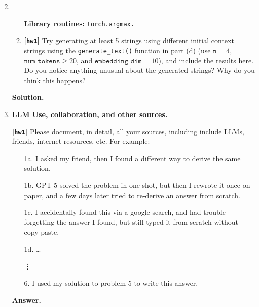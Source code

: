 \documentclass{article}
\def\hw{\textbf{[\texttt{hw1}]}\xspace}
\theoremstyle{definition}
\theoremstyle{remark}
\newenvironment{Q}
{%
  \clearpage
  \item
  }
  {%
    \phantom{s} %
    \bigskip
    \textbf{Solution.}
  }
\begin{document}
\begin{enumerate}[font={\Large\bfseries},left=0pt]
\begin{Q}
\begin{enumerate}
    \textbf{Library routines:} \texttt{torch.argmax.}
    
    \item \hw Try generating at least 5 strings using different initial context strings
    using the \texttt{generate\_text()} function in part (d) (use $\texttt{n}=4$, $\texttt{num\_tokens} \geq 20$, and $\texttt{embedding\_dim}=10$),
    and include the results here. Do you notice anything unusual about the generated strings? Why do you think this happens?
    \end{enumerate}
    \end{Q}
    \clearpage
    \item \textbf{\Large LLM Use, collaboration, and other sources.}
    
    \hw Please document, in detail, all your sources, including include LLMs, friends,
    internet resources, etc.  For example:
    \begin{enumerate}
      \item[1a.] I asked my friend, then I found a different way to derive the same solution.
      \item[1b.] GPT-5 solved the problem in one shot, but then I rewrote it once on
        paper, and a few days later tried to re-derive an answer from scratch.
      \item[1c.] I accidentally found this via a google search,
        and had trouble forgetting the answer I found, but still typed it from scratch
        without copy-paste.
      \item[1d.] \dots
      \item[\vdots] 
      \item[6.] I used my solution to problem 5 to write this answer.
    \end{enumerate}

    \bigskip
    \textbf{Answer.}
\end{enumerate}
\clearpage


\end{document}
